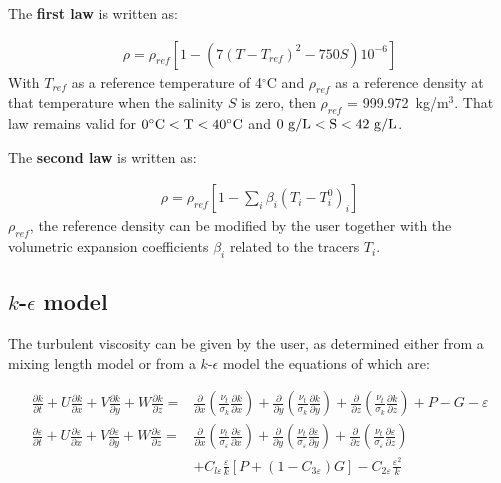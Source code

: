 The \textbf{first law} is written as:

\begin{align}
\rho =\rho _{ref} \left[1-\left(7\left(T-T_{ref} \right)^{2} -750S\right)10^{-6} \right]
\end{align}
With $T_{ref} $ as a reference temperature of 4${}^\circ$C and $\rho _{ref} $
as a reference density at that temperature when the salinity $S$ is
zero, then $\rho _{ref} $ = 999.972~kg/m${}^{3}$. That law remains valid for
$0^{\circ} \rm{C} < T < 40^{\circ} \rm{C}$ and $0~\rm{g/L} < S < 42~\rm{g/L}$.

The \textbf{second law} is written as:

\begin{align}
\rho =\rho _{ref} \left[1-\sum _{i}\beta _{i} \left(T_{i} -T_{i}^{0} \right)_{i}  \right]
\end{align}
$\rho _{ref}$,
the reference density can be modified by the user together with the volumetric
expansion coefficients $\beta _{i}$ related to the tracers $T_{i}$.

\subsection{$k$-$\epsilon$ model}

The turbulent viscosity can be given by the user, as determined either from a
mixing length model or from a $k$-$\epsilon$ model the equations of which are:

\begin{subequations}
\begin{align}
\frac{\partial k}{\partial t}
 + U\frac{\partial k}{\partial x} + V\frac{\partial k}{\partial y}
 + W\frac{\partial k}{\partial z} =&
\frac{\partial }{\partial x}
\left(\frac{\nu _{t} }{\sigma _{k} } \frac{\partial k}{\partial x} \right)
 + \frac{\partial }{\partial y}
\left(\frac{\nu _{t} }{\sigma _{k} } \frac{\partial k}{\partial y} \right)
 + \frac{\partial }{\partial z}
\left(\frac{\nu _{t} }{\sigma _{k} } \frac{\partial k}{\partial z} \right)
 + P -G - \varepsilon
\\
\frac{\partial \varepsilon }{\partial t}
 + U\frac{\partial \varepsilon}{\partial x}
 + V\frac{\partial \varepsilon}{\partial y}
 + W\frac{\partial \varepsilon }{\partial z}
 =& \frac{\partial }{\partial x}
\left(\frac{\nu _{t} }{\sigma _{\varepsilon } } \frac{\partial \varepsilon }{\partial x} \right )
+ \frac{\partial }{\partial y}
\left(\frac{\nu _{t} }{\sigma _{\varepsilon } } \frac{\partial \varepsilon }{\partial y} \right)
 + \frac{\partial }{\partial z}
\left(\frac{\nu _{t} }{\sigma _{\varepsilon } } \frac{\partial \varepsilon }{\partial z} \right)
\\
 &+ C_{l\varepsilon } \frac{\varepsilon }{k}
\left[P+\left(1-C_{3\varepsilon } \right)G\right]
- C_{2\varepsilon } \frac{\varepsilon^{2} }{k}
\end{align}
\end{subequations}

